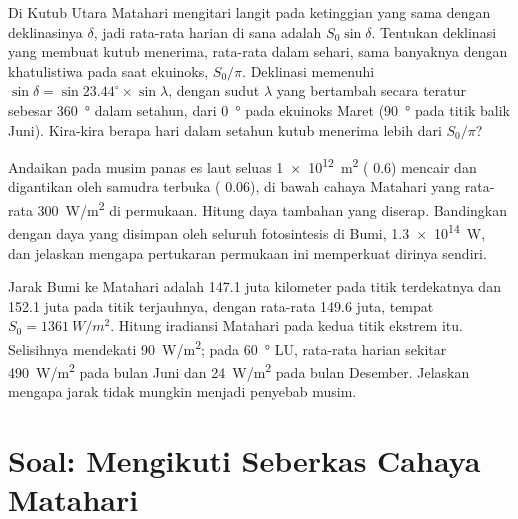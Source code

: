 \begin{exercise}[$\star\star\star$]\label{exo:g10:earth-energy-budget:13}
Di Kutub Utara Matahari mengitari langit pada ketinggian yang sama dengan
deklinasinya $\delta$, jadi  rata-rata harian di sana adalah $S_0 \sin
\delta$. Tentukan deklinasi yang membuat kutub menerima, rata-rata dalam
sehari, sama banyaknya dengan khatulistiwa pada saat ekuinoks, $S_0/\pi$.
Deklinasi memenuhi $\sin\delta = \sin 23.44^\circ \times \sin\lambda$, dengan
sudut $\lambda$ yang bertambah secara teratur sebesar \qty{360}{\degree} dalam
setahun, dari \qty{0}{\degree} pada ekuinoks Maret (\qty{90}{\degree} pada
titik balik Juni). Kira-kira berapa hari dalam setahun kutub menerima lebih
dari $S_0/\pi$?
\end{exercise}

\begin{exercise}[$\star\star\star$]\label{exo:g10:earth-energy-budget:14}
Andaikan pada musim panas es laut seluas \qty{1e12}{m^2} ( 0.6) mencair
dan digantikan oleh samudra terbuka ( 0.06), di bawah cahaya Matahari
yang rata-rata \qty{300}{W/m^2} di permukaan. Hitung daya tambahan yang
diserap. Bandingkan dengan daya yang disimpan oleh seluruh fotosintesis di
Bumi, \qty{1.3e14}{W}, dan jelaskan mengapa pertukaran permukaan ini
memperkuat dirinya sendiri.
\end{exercise}

\begin{exercise}[$\star\star\star$]\label{exo:g10:earth-energy-budget:15}
Jarak Bumi ke Matahari adalah \num{147.1} juta kilometer pada titik
terdekatnya dan \num{152.1} juta pada titik terjauhnya, dengan rata-rata
\num{149.6} juta, tempat $S_0 = \qty{1361}{W/m^2}$. Hitung iradiansi Matahari
pada kedua titik ekstrem itu. Selisihnya mendekati \qty{90}{W/m^2}; pada
\qty{60}{\degree} LU,  rata-rata harian sekitar \qty{490}{W/m^2} pada
bulan Juni dan \qty{24}{W/m^2} pada bulan Desember. Jelaskan mengapa jarak
tidak mungkin menjadi penyebab musim.
\end{exercise}

\section{Soal: Mengikuti Seberkas Cahaya Matahari}

